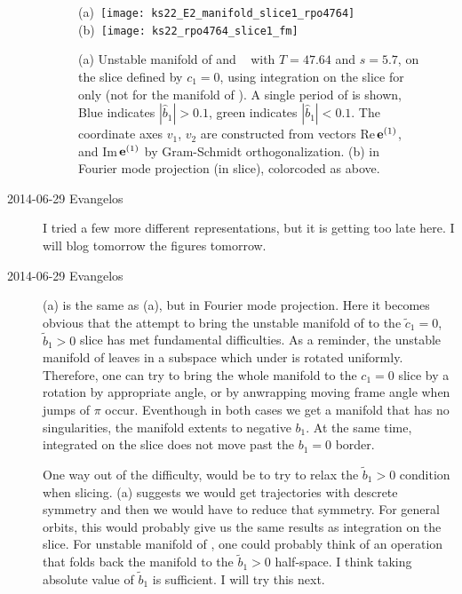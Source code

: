 \begin{description}
\begin{figure}
\begin{center}
(a)~\texttt{[image: ks22\_E2\_manifold\_slice1\_rpo4764]}~
(b)~\texttt{[image: ks22\_rpo4764\_slice1\_fm]}~
\end{center}
\caption{
(a) Unstable manifold of  and \rpo\  with $T=47.64$ and $s=5.7$,
on the slice defined by $c_1=0$, using integration on the slice for  only
(not for the manifold of ).
A single period of  is shown, Blue indicates $|\hat{b}_1|>0.1$, green indicates
 $|\hat{b}_1|<0.1$.
The coordinate axes $v_1$, $v_2$ are constructed from vectors Re\,$\jEigvec[1]$,
and Im\,$\jEigvec[1]$ by Gram-Schmidt
orthogonalization.
(b)   in Fourier mode projection (in slice), colorcoded as above.
       }
\label{f:ks22_E2_manifold_slice1_rpo4764}
\end{figure}

\item[2014-06-29 Evangelos]
I tried a few more different representations, but it is getting too late here.
I will blog tomorrow the figures tomorrow.

\item[2014-06-29 Evangelos] (a) is the same as
(a), but in Fourier mode projection.
Here it becomes obvious that the attempt to bring the unstable manifold of
 to the $\tilde{c}_1=0$, $\tilde{b}_1>0$ slice has met fundamental difficulties.
As a reminder, the unstable manifold of  leaves in a subspace which
under  is rotated uniformly. Therefore, one can try to bring the whole
manifold to the $c_1=0$ slice by a rotation by appropriate angle, or by
anwrapping moving frame angle when jumps of $\pi$ occur. Eventhough in both
cases we get a manifold that has no singularities, the manifold extents to
negative $b_1$. At the same time,  integrated on the slice does not
move past the $b_1=0$ border.

One way out of the difficulty, would be to try to relax the $\tilde{b}_1>0$ condition
when slicing. (a) suggests we would
get trajectories with descrete symmetry and then we would have to reduce that
symmetry. For general orbits, this would probably give us the same results as
integration on the slice. For unstable manifold of , one could probably
think of an operation that folds back the manifold to the $\tilde{b}_1>0$ half-space.
I think taking absolute value of $\tilde{b}_1$ is sufficient. I will try this next.


\end{description}
